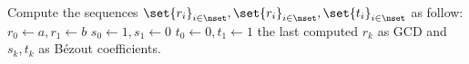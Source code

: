 \documentclass{subfiles}
\begin{document}
    \begin{algorithm}
        \caption{Euclidean algorithm}\label{algo:extended-euclidean}
        Compute the sequences $\set{r_{i}}_{i \in \nset},
            \set{r_{i}}_{i \in \nset}, \set{t_{i}}_{i \in \nset}$ as follow: \DontPrintSemicolon\;
        \Indp$r_{0} \leftarrow a, r_{1} \leftarrow b$ \DontPrintSemicolon\;
        $s_{0} \leftarrow 1, s_{1} \leftarrow 0$ \DontPrintSemicolon\;
        $t_{0} \leftarrow 0, t_{1} \leftarrow 1$ \DontPrintSemicolon\;
        \Indm\Return the last computed $r_{k}$ as GCD and $s_{k}, t_{k}$ as Bézout coefficients.
    \end{algorithm}
\end{document}

